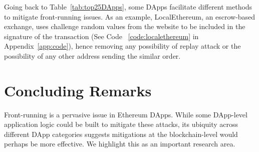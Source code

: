 
Going back to Table~\ref{tab:top25DApps}, some DApps facilitate different methods to mitigate front-running issues. As an example, LocalEthereum, an escrow-based exchange, uses challenge random values from the website to be included in the signature of the transaction (See Code ~\ref{code:localethereum} in Appendix~\ref{app:code}), hence removing any possibility of replay attack or the possibility of any other address sending the similar order. 








\section{Concluding Remarks}

Front-running is a pervasive issue in Ethereum DApps. While some DApp-level application logic could be built to mitigate these attacks, its ubiquity across different DApp categories suggests mitigations at the blockchain-level would perhaps be more effective. We highlight this as an important research area. 



